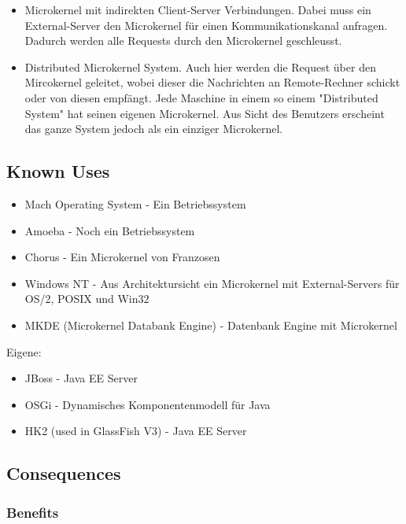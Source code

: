 \begin{itemize}
	\item Microkernel mit indirekten Client-Server Verbindungen. Dabei muss ein External-Server den Microkernel für einen Kommunikationskanal anfragen. Dadurch werden alle Requests durch den Microkernel geschleusst.
	\item Distributed Microkernel System. Auch hier werden die Request über den Mircokernel geleitet, wobei dieser die Nachrichten an Remote-Rechner schickt oder von diesen empfängt. Jede Maschine in einem so einem "Distributed System" hat seinen eigenen Microkernel. Aus Sicht des Benutzers erscheint das ganze System jedoch als ein einziger Microkernel.
\end{itemize}

\subsection*{Known Uses}


\begin{itemize}
	\item Mach Operating System - Ein Betriebssystem
	\item Amoeba - Noch ein Betriebssystem
	\item Chorus - Ein Microkernel von Franzosen
	\item Windows NT - Aus Architektursicht ein Microkernel mit External-Servers für OS/2, POSIX und Win32
	\item MKDE (Microkernel Databank Engine) - Datenbank Engine mit Microkernel
\end{itemize}

Eigene:

\begin{itemize}
	\item JBoss - Java EE Server
	\item OSGi - Dynamisches Komponentenmodell für Java
	\item HK2 (used in GlassFish V3) - Java EE Server
\end{itemize}

\subsection*{Consequences}


\subsubsection*{Benefits}


